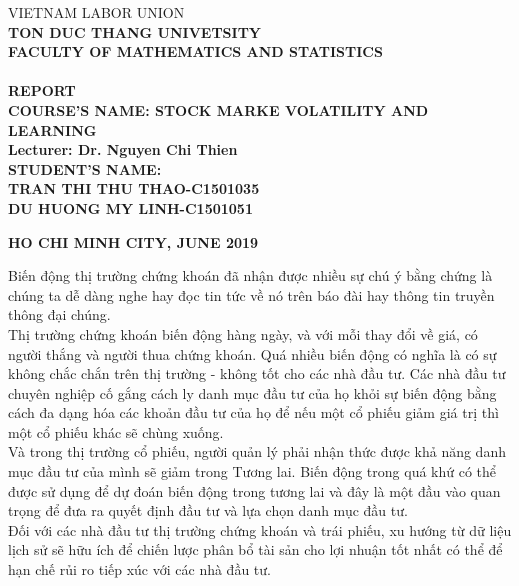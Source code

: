 \documentclass[10pt,a4paper]{article}
\begin{document}
\fontsize{14pt}{18pt}\selectfont
\begin{titlepage}
	\begin{center}
		{\large {VIETNAM LABOR UNION}}\\
		{\large \textbf{TON DUC THANG UNIVETSITY}}\\
		{\large \textbf{FACULTY OF MATHEMATICS AND STATISTICS}}\\[0.5cm]
		\hfill\\
		\vspace{2cm}
		{\Huge{\textbf{REPORT}}}\\
		\vspace{2cm}
		{\Large\textbf{COURSE'S NAME: STOCK MARKE VOLATILITY AND LEARNING}}\\
			\vspace*{1cm}
		{\Large\textbf{Lecturer: Dr. Nguyen Chi Thien}}\\
			\vspace*{3cm}
		{\large\textbf{\noindent STUDENT’S NAME:\\ TRAN THI THU THAO-C1501035\\DU HUONG MY LINH-C1501051}}\\
	
		
	\end{center}
	\vspace{2cm}
	\begin{center}
		{\textbf {HO CHI MINH CITY, JUNE 2019}}
	\end{center}
\end{titlepage}
Biến động thị trường chứng khoán đã nhận được nhiều sự chú ý bằng chứng là chúng ta dễ dàng nghe hay đọc tin tức về nó trên báo đài hay thông tin truyền thông đại chúng. \\
	Thị trường chứng khoán biến động hàng ngày, và với mỗi thay đổi về giá, có người thắng và người thua chứng khoán. Quá nhiều biến động có nghĩa là có sự không chắc chắn trên thị trường - không tốt cho các nhà đầu tư. Các nhà đầu tư chuyên nghiệp cố gắng cách ly danh mục đầu tư của họ khỏi sự biến động bằng cách đa dạng hóa các khoản đầu tư của họ để nếu một cổ phiếu giảm giá trị thì một cổ phiếu khác sẽ chùng xuống.\\
	Và trong thị trường cổ phiếu, người quản lý phải nhận thức được khả năng danh mục đầu tư của mình sẽ giảm trong
	Tương lai. Biến động trong quá khứ có thể được sử dụng để dự đoán biến động trong tương lai và đây là một đầu vào quan trọng để đưa ra quyết định đầu tư và lựa chọn danh mục đầu tư.\\
	Đối với các nhà đầu tư thị trường chứng khoán và trái phiếu, xu hướng từ dữ liệu lịch sử sẽ hữu ích để chiến lược phân bổ tài sản cho lợi nhuận tốt nhất có thể để hạn chế rủi ro tiếp xúc với các nhà đầu tư.\\
	
\end{document}
